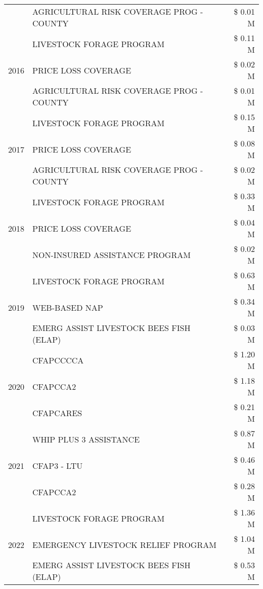 \begin{tabular}{llr}
 & AGRICULTURAL RISK COVERAGE PROG - COUNTY & \$ 0.01 M \\
\cline{1-3}
\multirow[t]{3}{*}{2016} & LIVESTOCK FORAGE PROGRAM & \$ 0.11 M \\
 & PRICE LOSS COVERAGE & \$ 0.02 M \\
 & AGRICULTURAL RISK COVERAGE PROG - COUNTY & \$ 0.01 M \\
\cline{1-3}
\multirow[t]{3}{*}{2017} & LIVESTOCK FORAGE PROGRAM & \$ 0.15 M \\
 & PRICE LOSS COVERAGE & \$ 0.08 M \\
 & AGRICULTURAL RISK COVERAGE PROG - COUNTY & \$ 0.02 M \\
\cline{1-3}
\multirow[t]{3}{*}{2018} & LIVESTOCK FORAGE PROGRAM & \$ 0.33 M \\
 & PRICE LOSS COVERAGE & \$ 0.04 M \\
 & NON-INSURED ASSISTANCE PROGRAM & \$ 0.02 M \\
\cline{1-3}
\multirow[t]{3}{*}{2019} & LIVESTOCK FORAGE PROGRAM & \$ 0.63 M \\
 & WEB-BASED NAP & \$ 0.34 M \\
 & EMERG ASSIST LIVESTOCK BEES FISH (ELAP) & \$ 0.03 M \\
\cline{1-3}
\multirow[t]{3}{*}{2020} & CFAPCCCCA & \$ 1.20 M \\
 & CFAPCCA2 & \$ 1.18 M \\
 & CFAPCARES & \$ 0.21 M \\
\cline{1-3}
\multirow[t]{3}{*}{2021} & WHIP PLUS 3 ASSISTANCE & \$ 0.87 M \\
 & CFAP3 - LTU & \$ 0.46 M \\
 & CFAPCCA2 & \$ 0.28 M \\
\cline{1-3}
\multirow[t]{3}{*}{2022} & LIVESTOCK FORAGE PROGRAM & \$ 1.36 M \\
 & EMERGENCY LIVESTOCK RELIEF PROGRAM & \$ 1.04 M \\
 & EMERG ASSIST LIVESTOCK BEES FISH (ELAP) & \$ 0.53 M \\
\cline{1-3}
\bottomrule
\end{tabular}
